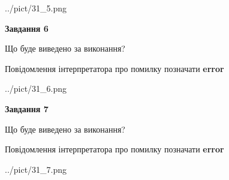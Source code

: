 \documentclass[10pt, ukrainian]{article}
\begin{document}
{\begin {large}
\begin{center}
	{../pict/31_5.png}
\end{center}
\newpage

{\begin {center}\textbf{Завдання 6}\end {center}}\par
Що буде виведено за виконання? \par
Повідомлення інтерпретатора про помилку позначати \textbf{error}

\begin{center}
	{../pict/31_6.png}
\end{center}
\newpage

{\begin {center}\textbf{Завдання 7}\end {center}}\par
Що буде виведено за виконання? \par
Повідомлення інтерпретатора про помилку позначати \textbf{error}

\begin{center}
	{../pict/31_7.png}
\end{center}
\newpage

\end {large}}
\end{document}

